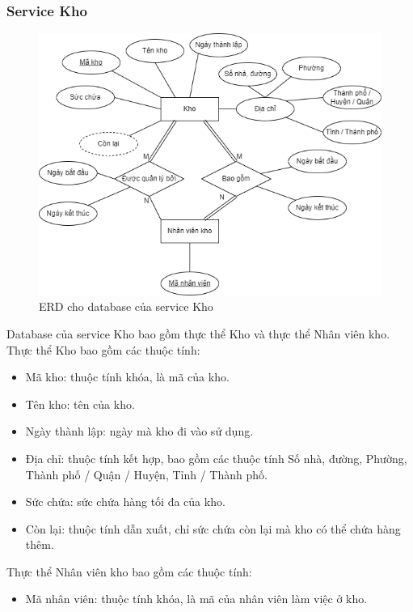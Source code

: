 \subsubsection{Service Kho}
\begin{figure}[!htp]
    \begin{center}
        \includegraphics[width=1\textwidth]{img/database/erd/shop_online-Kho.png}
        \newline
        \caption{ERD cho database của service Kho}
    \end{center}
\end{figure}

\par Database của service Kho bao gồm thực thể Kho và thực thể Nhân viên kho. Thực thể Kho bao gồm các thuộc tính:
\begin{itemize}
    \item Mã kho: thuộc tính khóa, là mã của kho.
    \item Tên kho: tên của kho.
    \item Ngày thành lập: ngày mà kho đi vào sử dụng.
    \item Địa chỉ: thuộc tính kết hợp, bao gồm các thuộc tính Số nhà, đường, Phường, Thành phố / Quận / Huyện, Tỉnh / Thành phố.
    \item Sức chứa: sức chứa hàng tối đa của kho.
    \item Còn lại: thuộc tính dẫn xuất, chỉ sức chứa còn lại mà kho có thể chứa hàng thêm.
\end{itemize}

\par Thực thể Nhân viên kho bao gồm các thuộc tính:
\begin{itemize}
    \item Mã nhân viên: thuộc tính khóa, là mã của nhân viên làm việc ở kho.
\end{itemize}

